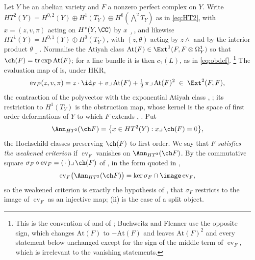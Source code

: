 \begin{setupenv}\label{setup:criterion}
Let $Y$ be an abelian variety and $F$ a nonzero perfect complex on $Y$. Write
$HT^{2}(Y)=H^{0,2}(Y)\oplus H^{1}(T_{Y})\oplus H^{0}(\bigwedge^{2}T_{Y})$ as
in \eqref{eq:HT2}, with $x=(z,v,\pi)$ acting on $H^{*}(Y,\CC)$ by
$x\lrcorner$, and likewise $HT^{1}(Y)=H^{0,1}(Y)\oplus H^{0}(T_{Y})$, with
$(z,\theta)$ acting by $z\wedge$ and by the interior product $\theta\lrcorner$.
Normalise the Atiyah class $\mathrm{At}(F)\in\Ext^{1}(F,F\otimes\Omega^{1}_{Y})$
so that $\ch(F)=\operatorname{tr}\exp\mathrm{At}(F)$; for a line bundle it is
then $c_{1}(L)$, as in \eqref{eq:obdef}.%
\footnote{This is the convention of \cite{Tod09} and of
\cite[footnote 14]{Mar25a}; Buchweitz and Flenner use the opposite sign, which
changes $\mathrm{At}(F)$ to $-\mathrm{At}(F)$ and leaves $\mathrm{At}(F)^{2}$
and every statement below unchanged except for the sign of the middle term of
$\operatorname{ev}_{F}$, which is irrelevant to the vanishing statements.}
The evaluation map of  is, under HKR,
\begin{equation}\label{eq:evgeneral}
  \operatorname{ev}_{F}(z,v,\pi)=z\cdot\id_{F}+v\lrcorner\,\mathrm{At}(F)
  +\tfrac12\,\pi\lrcorner\,\mathrm{At}(F)^{2}\;\in\;\Ext^{2}(F,F),
\end{equation}
the contraction of the polyvector with the exponential Atiyah class
\cite[Theorem A]{Hua21}, \cite{BF08}; its restriction to $H^{1}(T_{Y})$ is the
obstruction map, whose kernel is the space of first order deformations of $Y$
to which $F$ extends \cite{Tod09}, \cite[Section 8.3]{Mar25a}. Put
\[
  \Ann_{HT^{2}}(\ch F)=\bigl\{x\in HT^{2}(Y):x\lrcorner\,\ch(F)=0\bigr\},
\]
the Hochschild classes preserving $\ch(F)$ to first order. We say that $F$
\emph{satisfies the weakened criterion} if $\operatorname{ev}_{F}$ vanishes on
$\Ann_{HT^{2}}(\ch F)$. By the commutative square
$\sigma_{F}\circ\operatorname{ev}_{F}=(\,\cdot\,)\lrcorner\,\ch(F)$ of
\cite[Proposition 6.2.1 and Corollary 6.3.2]{BF08}, in the form quoted in
\cite[Lemma 11.3]{Mar25b},
\[
  \operatorname{ev}_{F}\bigl(\Ann_{HT^{2}}(\ch F)\bigr)
  =\ker\sigma_{F}\cap\image\operatorname{ev}_{F},
\]
so the weakened criterion is exactly the hypothesis of
\cite[Question 11.4]{Mar25b}, that $\sigma_{F}$ restricts to the image of
$\operatorname{ev}_{F}$ as an injective map; (ii) is
the case of a split object.
\end{setupenv}

